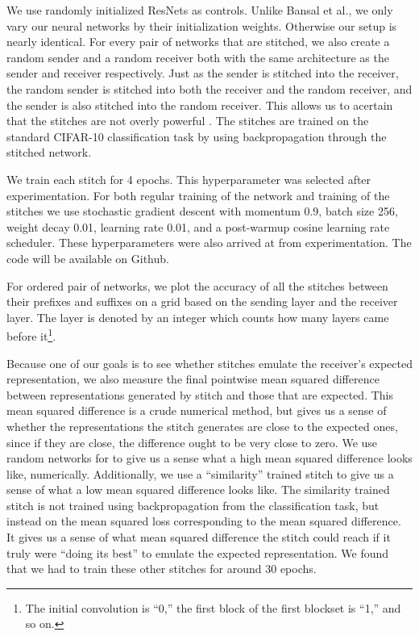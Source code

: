 \documentclass{article} %
\begin{document}
We use randomly initialized ResNets as controls. Unlike Bansal et al., we only vary our neural networks by their
initialization weights. Otherwise our setup is nearly identical.
For every pair of networks that are stitched, we also create a random sender and a random
receiver both with the same architecture as the sender and receiver respectively. Just as the sender is stitched
into the receiver, the random sender is stitched into both the receiver and the random receiver, and the sender
is also stitched into the random receiver. This allows us to acertain that the stitches
are not overly powerful \cite{Bansal2021RevisitingMS}. The stitches are trained on
the standard CIFAR-10 classification task by using backpropagation through the stitched network.

We train each stitch for 4 epochs. This hyperparameter was selected after experimentation. For both
regular training of the network and training of the stitches we use stochastic gradient descent with momentum 0.9,
batch size 256, weight decay 0.01, learning rate 0.01, and a post-warmup cosine learning rate scheduler.
These hyperparameters were also arrived at from experimentation. The code will be available on Github.

For ordered pair of networks, we plot the accuracy of all the stitches between their prefixes and suffixes
on a grid based on the sending layer and the receiver layer. The layer is
denoted by an integer which counts how many layers came before it\footnote{
   The initial convolution is ``0,'' the first block of the first blockset is ``1,'' and so on.
}.

Because one of our goals is to see whether stitches emulate the receiver's expected representation, we
also measure the final pointwise mean squared difference between representations generated by stitch and
those that are expected. This mean squared difference is a crude numerical method, 
but gives us a sense of whether the representations
the stitch generates are close to the expected ones, since if they are close, the difference ought to be very close
to zero. We use random networks for to give us a sense what a high mean squared difference
looks like, numerically. Additionally, we use a ``similarity'' trained stitch to give us a sense of what a low mean
squared difference looks like. The similarity trained stitch is not trained using backpropagation
from the classification task, but instead on the mean squared loss corresponding to the mean squared difference.
It gives us a sense of what mean squared difference the stitch could reach if it truly were ``doing its best''
to emulate the expected representation. We found that we had to train these other stitches for around 30 epochs.
\end{document}

